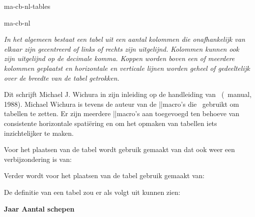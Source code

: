 \startonderdeel ma-cb-nl-tables

\produkt ma-cb-nl




{\em In het algemeen bestaat een tabel uit een aantal
kolommen die onafhankelijk van elkaar zijn gecentreerd of
links of rechts zijn uitgelijnd. Kolommen kunnen ook zijn
uitgelijnd op de decimale komma. Koppen worden boven een of
meerdere kolommen geplaatst en horizontale en verticale
lijnen worden geheel of gedeeltelijk over de breedte van de
tabel getrokken.}

Dit schrijft Michael J. Wichura in zijn inleiding op de
handleiding van \TABLE\ (\TABLE\ manual, 1988). Michael
Wichura is tevens de auteur van de \TABLE||macro's die
\CONTEXT\ gebruikt om tabellen te zetten. Er zijn meerdere
\CONTEXT||macro's aan toegevoegd ten behoeve van consistente
horizontale spati\"ering en om het opmaken van tabellen iets
inzichtelijker te maken.

Voor het plaatsen van de tabel wordt gebruik gemaakt van
\type{\plaatstabel} dat ook weer een verbijzondering is van:


Verder wordt voor het plaatsen van de tabel gebruik gemaakt
van:


De definitie van een tabel zou er als volgt uit kunnen zien:

\startbuffer
{}
\starttabel[|c|c|]
\HL
\NC \bf Jaar \NC \bf Aantal schepen \NC\SR
\HL
{}  \NC\FR
{}  \NC\MR
{}  \NC\MR
{}  \NC\LR
\HL
\stoptabel
\stopbuffer


